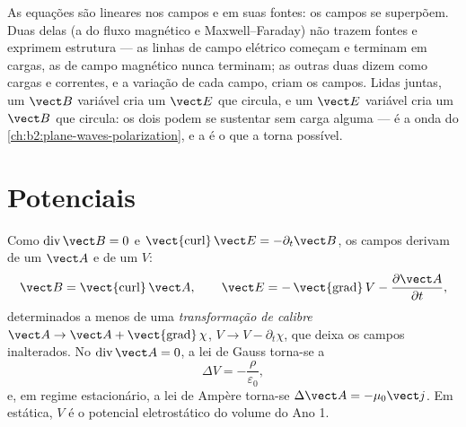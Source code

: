 \begin{remark}\label{rem:b2:maxwell-equations:linearity}
As equações são lineares nos campos e em suas fontes: os campos se
superpõem. Duas delas (a do fluxo magnético e Maxwell--Faraday) não trazem fontes e
exprimem estrutura --- as linhas de campo elétrico começam e terminam em cargas,
as de campo magnético nunca terminam; as outras duas dizem como cargas e
correntes, e a variação de cada campo, criam os campos. Lidas
juntas, um $\vect B$ variável cria um $\vect E$ que circula, e um $\vect E$
variável cria um $\vect B$ que circula: os dois podem se sustentar sem
carga alguma --- é a onda do
\cref{ch:b2:plane-waves-polarization}, e a  é
o que a torna possível.
\end{remark}

\section{Potenciais}

\begin{proposition}\label{prop:b2:maxwell-equations:potentials}
Como $\operatorname{div}\vect B = 0$ e $\operatorname{\vect{curl}}\vect E = -\partial_t
\vect B$, os campos derivam de um \emph{} $\vect A$ e de um
\emph{} $V$:
\[
\vect B = \operatorname{\vect{curl}}\vect A , \qquad
\vect E = -\operatorname{\vect{grad}}V - \frac{\partial\vect A}{\partial t} ,
\]
determinados a menos de uma \emph{transformação de calibre} $\vect A \to \vect A +
\operatorname{\vect{grad}}\chi$, $V \to V - \partial_t\chi$, que deixa os campos
inalterados. No \emph{} $\operatorname{div}\vect A = 0$, a lei de
Gauss torna-se a \emph{}
\[
\Delta V = -\frac\rho{\varepsilon_0} ,
\]
e, em regime estacionário, a lei de Ampère torna-se $\Delta\vect A = -\mu_0\vect j$.
Em estática, $V$ é o potencial eletrostático do volume do Ano 1.
\end{proposition}


